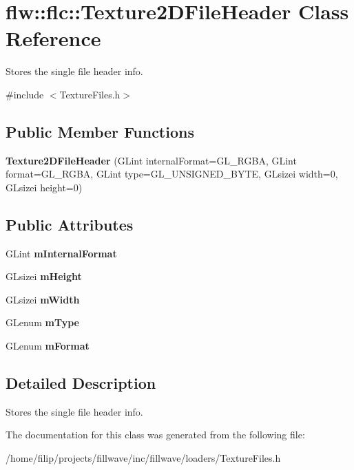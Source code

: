 \hypertarget{classflw_1_1flc_1_1Texture2DFileHeader}{}\section{flw\+:\+:flc\+:\+:Texture2\+D\+File\+Header Class Reference}
\label{classflw_1_1flc_1_1Texture2DFileHeader}


Stores the single file header info.  




{\ttfamily \#include $<$Texture\+Files.\+h$>$}

\subsection*{Public Member Functions}
\begin{DoxyCompactItemize}
\item 
\mbox{\label{classflw_1_1flc_1_1Texture2DFileHeader_a3537761f5ea4357996d4fa714d41431d}} 
{\bfseries Texture2\+D\+File\+Header} (G\+Lint internal\+Format=G\+L\+\_\+\+R\+G\+BA, G\+Lint format=G\+L\+\_\+\+R\+G\+BA, G\+Lint type=G\+L\+\_\+\+U\+N\+S\+I\+G\+N\+E\+D\+\_\+\+B\+Y\+TE, G\+Lsizei width=0, G\+Lsizei height=0)
\end{DoxyCompactItemize}
\subsection*{Public Attributes}
\begin{DoxyCompactItemize}
\item 
\mbox{\label{classflw_1_1flc_1_1Texture2DFileHeader_a49d8d1d35da7fa3c214b8a052a76d32c}} 
G\+Lint {\bfseries m\+Internal\+Format}
\item 
\mbox{\label{classflw_1_1flc_1_1Texture2DFileHeader_ac5012499cee078672caf0462d796c203}} 
G\+Lsizei {\bfseries m\+Height}
\item 
\mbox{\label{classflw_1_1flc_1_1Texture2DFileHeader_a7579b301c9555970d9de633d3a230103}} 
G\+Lsizei {\bfseries m\+Width}
\item 
\mbox{\label{classflw_1_1flc_1_1Texture2DFileHeader_a164b348dfbce34e0ae26fba2dcd37745}} 
G\+Lenum {\bfseries m\+Type}
\item 
\mbox{\label{classflw_1_1flc_1_1Texture2DFileHeader_ae6162c45fbdb378f24d8fdc10e6b691d}} 
G\+Lenum {\bfseries m\+Format}
\end{DoxyCompactItemize}


\subsection{Detailed Description}
Stores the single file header info. 

The documentation for this class was generated from the following file\+:\begin{DoxyCompactItemize}
\item 
/home/filip/projects/fillwave/inc/fillwave/loaders/Texture\+Files.\+h\end{DoxyCompactItemize}
